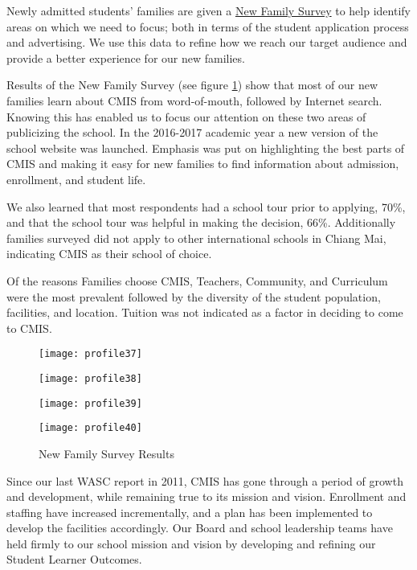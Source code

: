 Newly admitted students’ families are given a \href{https://docs.google.com/a/cmis.ac.th/forms/d/1basukpCBjcCMWXDh-cUUWW6lgk6zxYadGMn1EzFDQwc/viewanalytics}{New Family Survey} to help identify areas on which we need to focus; both in terms of the student application process and advertising. We use this data to refine how we reach our target audience and provide a better experience for our new families.

Results of the New Family Survey (see figure \ref{figure:newfamilysurvey}) show that most of our new families learn about CMIS from word-of-mouth, followed by Internet search. Knowing this has enabled us to focus our attention on these two areas of publicizing the school. In the 2016-2017 academic year a new version of the school website was launched. Emphasis was put on highlighting the best parts of CMIS and making it easy for new families to find information about admission, enrollment, and student life.

We also learned that most respondents had a school tour prior to applying, 70\%, and that the school tour was helpful in making the decision, 66\%. Additionally families surveyed did not apply to other international schools in Chiang Mai, indicating CMIS as their school of choice.

Of the reasons Families choose CMIS, Teachers, Community, and Curriculum were the most prevalent followed by the diversity of the student population, facilities, and location. Tuition was not indicated as a factor in deciding to come to CMIS.

\begin{figure}[H]
\begin{minipage}{0.5\textwidth}
\texttt{[image: profile37]}
\end{minipage}%
\begin{minipage}{0.5\textwidth}
\texttt{[image: profile38]}
\end{minipage}
\begin{minipage}{0.5\textwidth}
\texttt{[image: profile39]}
\end{minipage}%
\begin{minipage}{0.5\textwidth}
\texttt{[image: profile40]}
\end{minipage}
\caption{New Family Survey Results}
\label{figure:newfamilysurvey}
\end{figure}


Since our last WASC report in 2011, CMIS has gone through a period of growth and development, while remaining true to its mission and vision. Enrollment and staffing have increased incrementally, and a plan has been implemented to develop the facilities accordingly. Our Board and school leadership teams have held firmly to our school mission and vision by developing and refining our Student Learner Outcomes. 


